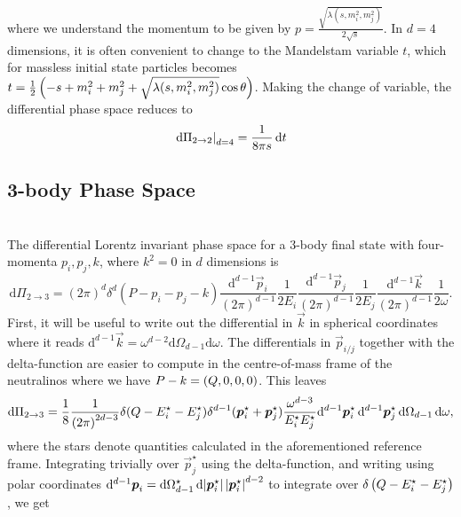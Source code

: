 \documentclass[../main.tex]{subfiles}
\begin{document}
            where we understand the momentum to be given by \(p = \frac{\sqrt{\lambda(s, m_i^2, m_j^2)}}{2\sqrt{s}}\).
            In \(d=4\) dimensions, it is often convenient to change to the Mandelstam variable \(t\), which for massless initial state particles becomes \(t=\frac{1}{2} \left(-s+m_i^2+m_j^2+\sqrt{\lambda(s,m_i^2,m_j^2)}\cos\theta\right)\).
            Making the change of variable, the differential phase space reduces to
            \begin{equation}
                \left.\mathrm{d}\Pi_{2\to 2}\right|_{d=4} = \frac{1}{8\pi s} \,\mathrm{d}t
            \end{equation}

        \subsection{3-body Phase Space}
            \\
            The differential Lorentz invariant phase space for a 3-body final state with four-momenta \(p_i, p_j, k\), where \(k^2=0\) in \(d\) dimensions is
            \begin{equation}
                \mathrm{d}\Pi_{2\to 3} = (2\pi)^d \delta^d(P - p_i - p_j - k) \frac{\mathrm{d}^{d-1} \vec{p}_i}{(2\pi)^{d-1}} \frac{1}{2E_i} \frac{\mathrm{d}^{d-1} \vec{p}_j}{(2\pi)^{d-1}} \frac{1}{2E_j} \frac{\mathrm{d}^{d-1} \vec{k}}{(2\pi)^{d-1}} \frac{1}{2\omega}.
            \end{equation}
            First, it will be useful to write out the differential in \(\vec{k}\) in spherical coordinates where it reads \(\mathrm{d}^{d-1}\vec{k} = \omega^{d-2} \mathrm{d}\Omega_{d-1} \mathrm{d}\omega\).
            The differentials in \(\vec{p}_{i/j}\) together with the delta-function are easier to compute in the centre-of-mass frame of the neutralinos where we have \(P - k = \left(Q, 0, 0, 0\right)\).
            This leaves
            \begin{equation}
                \mathrm{d}\Pi_{2\to 3} = \frac{1}{8} \frac{1}{\left(2\pi\right)^{2d-3}} \delta(Q - E_i^\star - E_j^\star) \delta^{d-1}(\boldsymbol{p}^\star_i + \boldsymbol{p}_j^\star) \frac{\omega^{d-3}}{E_i^\star E_j^\star} \mathrm{d}^{d-1}\boldsymbol{p}_i^\star\, \mathrm{d}^{d-1}\boldsymbol{p}_j^\star\, \mathrm{d}\Omega_{d-1}\, \mathrm{d}\omega,
            \end{equation}
            where the stars denote quantities calculated in the aforementioned reference frame.
            Integrating trivially over \(\vec{p}_j^\star\) using the delta-function, and writing using polar coordinates \(\mathrm{d}^{d-1}\boldsymbol{p}_i = \mathrm{d}\Omega_{d-1}^\star \, \mathrm{d}\!\left|\boldsymbol{p}_i^\star\right| \left|\boldsymbol{p}_i^\star\right|^{d-2}\) to integrate over \(\delta\left(Q - E_i^\star - E_j^\star\right)\), we get
\end{document}

